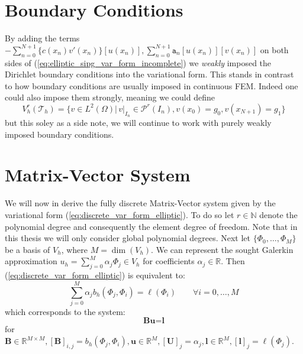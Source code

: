 \section{Boundary Conditions}
By adding the terms $-\sum_{n=0}^{N+1} \{c(x_n)v'(x_n)\}[u(x_n)], \sum_{n=0}^{N+1} \texttt{a}_n[u(x_n)][v(x_n)]$ on both sides
of (\ref{eq:elliptic_sipg_var_form_incomplete}) we \textit{weakly} imposed the Dirichlet
boundary conditions into the variational form. This stands in contrast to how boundary 
conditions are usually imposed in continuous FEM. Indeed one could also impose them strongly,
meaning we could define 
\begin{equation*}
    V_h^r(\mathcal{T}_h) = \{v \in L^2(\Omega) |\, v|_{I_n} \in \mathcal{P}^r(I_n), v(x_0)=g_0, v(x_{N+1})=g_1 \}
\end{equation*}
but this soley as a side note, we will continue to work with purely weakly imposed 
boundary conditions.  


\section{Matrix-Vector System}
We will now in derive the fully discrete Matrix-Vector system given by
the variational form (\ref{eq:discrete_var_form_elliptic}). To do so let
$r \in \mathbb{N}$ denote the polynomial degree and consequently the element degree of freedom. Note that in this thesis we will only consider global polynomial degrees.
Next let $\{\Phi_0,\ldots,\Phi_M\}$ be a basis of $V_h$, where $M = \dim(V_h)$.
We can represent the sought Galerkin approximation $u_h = \sum_{j=0}^{M} \alpha_j \Phi_j\in V_h$ for coefficients 
$\alpha_j \in \mathbb{R}$. Then (\ref{eq:discrete_var_form_elliptic}) is equivalent to:
\begin{equation*}
    \sum_{j=0}^{M} \alpha_j b_h(\Phi_j, \Phi_i) = \ell(\Phi_i) \qquad \forall i=0,\ldots,M
\end{equation*}
which corresponds to the system:
\begin{equation}
    \label{eq:fully_discrete_dg_system_elliptic}
    \textbf{Bu} = \textbf{l}
\end{equation}
for $ \textbf{B} \in \mathbb{R}^{M\times M}, [\textbf{B}]_{i,j} = b_h(\Phi_j, \Phi_i), 
\textbf{u} \in \mathbb{R}^M, [\textbf{U}]_j = \alpha_j, 
\textbf{l}\in\mathbb{R}^M, [\textbf{l}]_j = \ell(\Phi_j)$.


